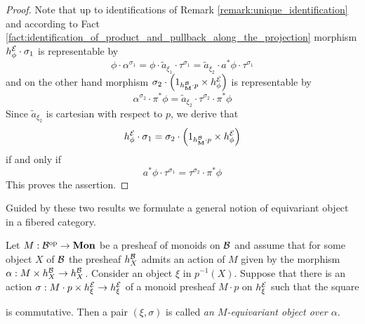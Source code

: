 \begin{proof}
Note that up to identifications of Remark \ref{remark:unique_identification} and according to Fact \ref{fact:identification_of_product_and_pullback_along_the_projection}  morphism $h^{{\mathcal E}}_{\phi}\cdot \sigma_1$ is representable by
$$\phi\cdot \alpha^{\sigma_1} = \phi\cdot \widetilde{a}_{\xi_1}\cdot \tau^{\sigma_1} = \widetilde{a}_{\xi_2}\cdot a^*\phi \cdot \tau^{\sigma_1}$$
and on the other hand morphism $\sigma_2\cdot \left(1_{h^{{\mathcal B}}_{\mathbf{M}}\cdot p}\times h^{{\mathcal E}}_{\phi}\right)$ is representable by
$$\alpha^{\sigma_2}\cdot \pi^*\phi = \widetilde{a}_{\xi_2}\cdot \tau^{\sigma_2}\cdot \pi^*\phi$$
Since $\widetilde{a}_{\xi_2}$ is cartesian with respect to $p$, we derive that
$$h^{{\mathcal E}}_{\phi}\cdot \sigma_1 = \sigma_2\cdot \left(1_{h^{{\mathcal B}}_{\mathbf{M}}\cdot p}\times h^{{\mathcal E}}_{\phi}\right)$$
if and only if
$$a^*\phi \cdot \tau^{\sigma_1} = \tau^{\sigma_2}\cdot \pi^*\phi$$
This proves the assertion.
\end{proof}
\noindent
Guided by these two results we formulate a general notion of equivariant object in a fibered category.

\begin{definition}
Let $M:{\mathcal B}^{\mathrm{op}}\rightarrow \mathbf{Mon}$ be a presheaf of monoids on ${\mathcal B}$ and assume that for some object $X$ of ${\mathcal B}$ the presheaf $h^{{\mathcal B}}_X$ admits an action of $M$ given by the morphism $\alpha:M\times h^{{\mathcal B}}_X\rightarrow h^{{\mathcal B}}_X$. Consider an object $\xi$ in $p^{-1}(X)$. Suppose that there is an action $\sigma:M\cdot p \times h^{{\mathcal E}}_\xi\rightarrow h^{{\mathcal E}}_\xi$ of a monoid presheaf $M\cdot p$ on $h^{{\mathcal E}}_\xi$ such that the square
\begin{center}
\end{center}
is commutative. Then a pair $(\xi,\sigma)$ is called \textit{an $M$-equivariant object over $\alpha$}.
\end{definition}

